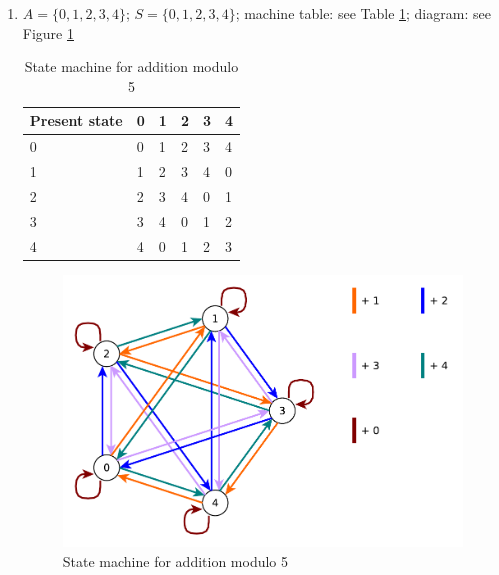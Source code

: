 \documentclass{article}
\begin{document}
\begin{enumerate}
    \item $A = \{0, 1, 2, 3, 4\}$; $S = \{0, 1, 2, 3, 4\}$; machine table: see Table \ref{tab:add-modulo-5}; diagram: see Figure \ref{fig:add-modulo-5}
    \begin{table}[]
        \centering
        \begin{tabular}{l|lllll}
        Present state & 0 & 1 & 2 & 3 & 4 \\ \hline
        0             & 0 & 1 & 2 & 3 & 4 \\
        1             & 1 & 2 & 3 & 4 & 0 \\
        2             & 2 & 3 & 4 & 0 & 1 \\
        3             & 3 & 4 & 0 & 1 & 2 \\
        4             & 4 & 0 & 1 & 2 & 3
        \end{tabular}
        \caption{State machine for addition modulo 5}
        \label{tab:add-modulo-5}
    \end{table}
    \begin{figure}[!ht]
        \centering
        \includegraphics[scale=0.5]{diagrams/add-modulo-5.pdf}
        \caption{State machine for addition modulo 5}
        \label{fig:add-modulo-5}
    \end{figure}


\end{enumerate}
\end{document}
